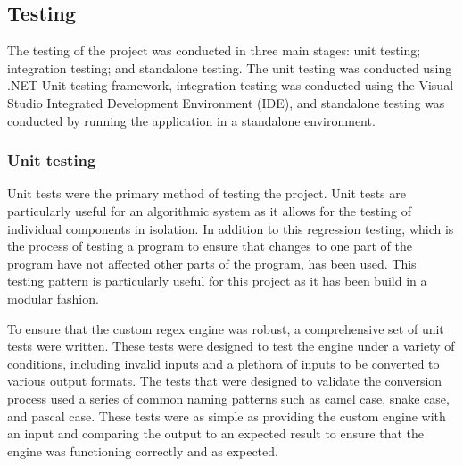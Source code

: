 \subsection{Testing}

The testing of the project was conducted in three main stages: unit testing; integration testing; and standalone testing. The unit testing was conducted using .NET Unit testing framework, integration testing was conducted using the Visual Studio Integrated Development Environment (IDE), and standalone testing was conducted by running the application in a standalone environment.

\subsubsection{Unit testing}
Unit tests were the primary method of testing the project. Unit tests are particularly useful for an algorithmic system as it allows for the testing of individual components in isolation. In addition to this regression testing, which is the process of testing a program to ensure that changes to one part of the program have not affected other parts of the program, has been used. This testing pattern is particularly useful for this project as it has been build in a modular fashion.

To ensure that the custom regex engine was robust, a comprehensive set of unit tests were written. These tests were designed to test the engine under a variety of conditions, including invalid inputs and a plethora of inputs to be converted to various output formats. The tests that were designed to validate the conversion process used a series of common naming patterns such as camel case, snake case, and pascal case. These tests were as simple as providing the custom engine with an input and comparing the output to an expected result to ensure that the engine was functioning correctly and as expected.

